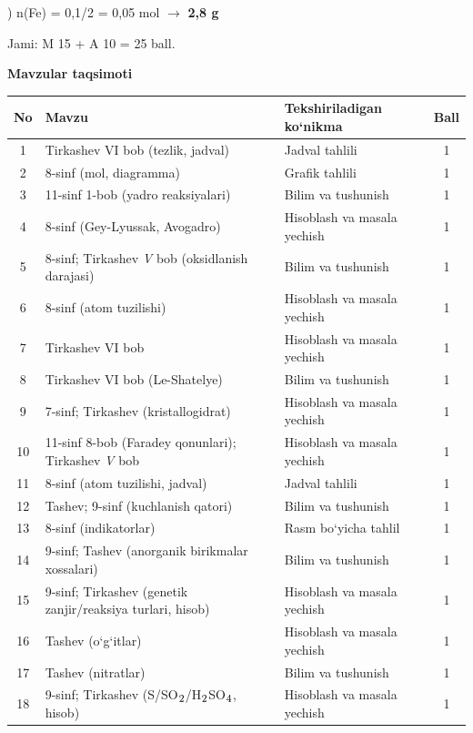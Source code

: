 \documentclass[11pt,a4paper]{article}
\renewcommand{\textsubscript}[1]{\ensuremath{_{\text{\fontsize{8}{8}\selectfont #1}}}}
\begin{document}
) n(Fe) = 0,1/2 = 0,05 mol $\to$ \textbf{2,8 g}\par
\noindent Jami: M 15 + A 10 = 25 ball.\par
\par\bigskip\noindent\textbf{Mavzular taqsimoti}\par\smallskip
{\small\noindent\begin{longtable}{|c|p{7.2cm}|p{5.4cm}|c|}\hline \textbf{No} & \textbf{Mavzu} & \textbf{Tekshiriladigan ko`nikma} & \textbf{Ball}\\\hline
1 & Tirkashev VI bob (tezlik, jadval) & Jadval tahlili & 1\\\hline
2 & 8-sinf (mol, diagramma) & Grafik tahlili & 1\\\hline
3 & 11-sinf 1-bob (yadro reaksiyalari) & Bilim va tushunish & 1\\\hline
4 & 8-sinf (Gey-Lyussak, Avogadro) & Hisoblash va masala yechish & 1\\\hline
5 & 8-sinf; Tirkashev \textit{V} bob (oksidlanish darajasi) & Bilim va tushunish & 1\\\hline
6 & 8-sinf (atom tuzilishi) & Hisoblash va masala yechish & 1\\\hline
7 & Tirkashev VI bob & Hisoblash va masala yechish & 1\\\hline
8 & Tirkashev VI bob (Le-Shatelye) & Bilim va tushunish & 1\\\hline
9 & 7-sinf; Tirkashev (kristallogidrat) & Hisoblash va masala yechish & 1\\\hline
10 & 11-sinf 8-bob (Faradey qonunlari); Tirkashev \textit{V} bob & Hisoblash va masala yechish & 1\\\hline
11 & 8-sinf (atom tuzilishi, jadval) & Jadval tahlili & 1\\\hline
12 & Tashev; 9-sinf (kuchlanish qatori) & Bilim va tushunish & 1\\\hline
13 & 8-sinf (indikatorlar) & Rasm bo`yicha tahlil & 1\\\hline
14 & 9-sinf; Tashev (anorganik birikmalar xossalari) & Bilim va tushunish & 1\\\hline
15 & 9-sinf; Tirkashev (genetik zanjir/reaksiya turlari, hisob) & Hisoblash va masala yechish & 1\\\hline
16 & Tashev (o`g`itlar) & Hisoblash va masala yechish & 1\\\hline
17 & Tashev (nitratlar) & Bilim va tushunish & 1\\\hline
18 & 9-sinf; Tirkashev (S/SO\textsubscript{2}/H\textsubscript{2}SO\textsubscript{4}, hisob) & Hisoblash va masala yechish & 1\\\hline

\end{longtable}}
\end{document}
